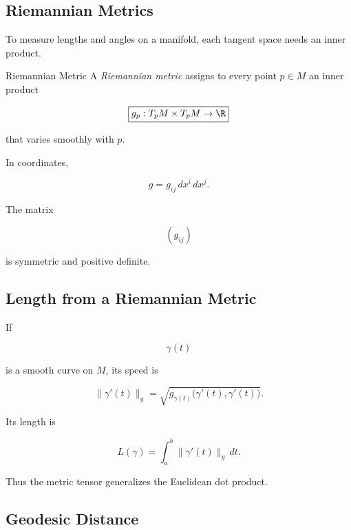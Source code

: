\subsection{Riemannian Metrics}
\label{subsec:riemannian-metrics}

To measure lengths and angles on a manifold, each tangent space needs an
inner product.

\begin{definitionbox}{Riemannian Metric}
A \emph{Riemannian metric} assigns to every point \(p\in M\) an inner
product

\[
\boxed{
g_p:T_pM\times T_pM\to\R
}
\]

that varies smoothly with \(p\).
\end{definitionbox}

In coordinates,

\[
\boxed{
g
=
g_{ij}\,dx^i\,dx^j.
}
\]

The matrix

\[
(g_{ij})
\]

is symmetric and positive definite.

\subsection{Length from a Riemannian Metric}
\label{subsec:riemannian-length}

If

\[
\gamma(t)
\]

is a smooth curve on \(M\), its speed is

\[
\boxed{
\|\gamma'(t)\|_g
=
\sqrt{
g_{\gamma(t)}
\bigl(
\gamma'(t),
\gamma'(t)
\bigr)
}.
}
\]

Its length is

\[
\boxed{
L(\gamma)
=
\int_a^b
\|\gamma'(t)\|_g\,dt.
}
\]

Thus the metric tensor generalizes the Euclidean dot product.

\subsection{Geodesic Distance}
\label{subsec:geodesic-distance}

